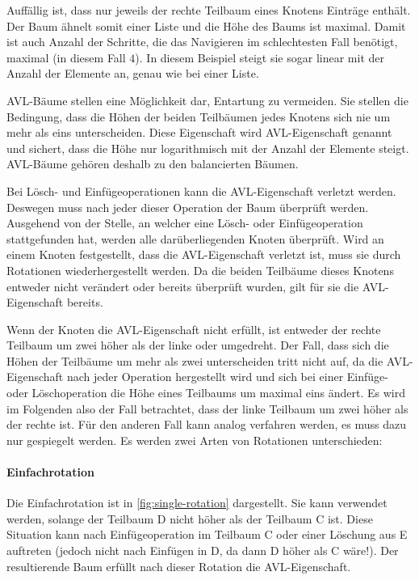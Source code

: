 \documentclass[a4paper, parskip]{scrartcl}
\begin{document}
Auffällig ist, dass nur jeweils der rechte Teilbaum eines Knotens Einträge enthält.
Der Baum ähnelt somit einer Liste und die Höhe des Baums ist maximal.
Damit ist auch Anzahl der Schritte, die das Navigieren im schlechtesten Fall benötigt, maximal (in diesem Fall $4$).
In diesem Beispiel steigt sie sogar linear mit der Anzahl der Elemente an, genau wie bei einer Liste.

AVL-Bäume\cite{avl62} stellen eine Möglichkeit dar, Entartung zu vermeiden.
Sie stellen die Bedingung, dass die Höhen der beiden Teilbäumen jedes Knotens sich nie um mehr als eins unterscheiden.
Diese Eigenschaft wird AVL-Eigenschaft genannt und sichert, dass die Höhe nur logarithmisch mit der Anzahl der Elemente steigt.
AVL-Bäume gehören deshalb zu den balancierten Bäumen.

Bei Lösch- und Einfügeoperationen kann die AVL-Eigenschaft verletzt werden.
Deswegen muss nach jeder dieser Operation der Baum überprüft werden.
Ausgehend von der Stelle, an welcher eine Lösch- oder Einfügeoperation stattgefunden hat, werden alle darüberliegenden Knoten überprüft.
Wird an einem Knoten festgestellt, dass die AVL-Eigenschaft verletzt ist, muss sie durch Rotationen wiederhergestellt werden.
Da die beiden Teilbäume dieses Knotens entweder nicht verändert oder bereits überprüft wurden, gilt für sie die AVL-Eigenschaft bereits.

Wenn der Knoten die AVL-Eigenschaft nicht erfüllt, ist entweder der rechte Teilbaum um zwei höher als der linke oder umgedreht. 
Der Fall, dass sich die Höhen der Teilbäume um mehr als zwei unterscheiden tritt nicht auf, da die AVL-Eigenschaft nach jeder Operation hergestellt wird und sich bei einer Einfüge- oder Löschoperation die Höhe eines Teilbaums um maximal eins ändert.
Es wird im Folgenden also der Fall betrachtet, dass der linke Teilbaum um zwei höher als der rechte ist.
Für den anderen Fall kann analog verfahren werden, es muss dazu nur gespiegelt werden.
Es werden zwei Arten von Rotationen unterschieden:

\paragraph{Einfachrotation}
Die Einfachrotation ist in \autoref{fig:single-rotation} dargestellt. 
Sie kann verwendet werden, solange der Teilbaum D nicht höher als der Teilbaum C ist.
Diese Situation kann nach Einfügeoperation im Teilbaum C oder einer Löschung aus E auftreten (jedoch nicht nach Einfügen in D, da dann D höher als C wäre!).
Der resultierende Baum erfüllt nach dieser Rotation die AVL-Eigenschaft.
\end{document}
